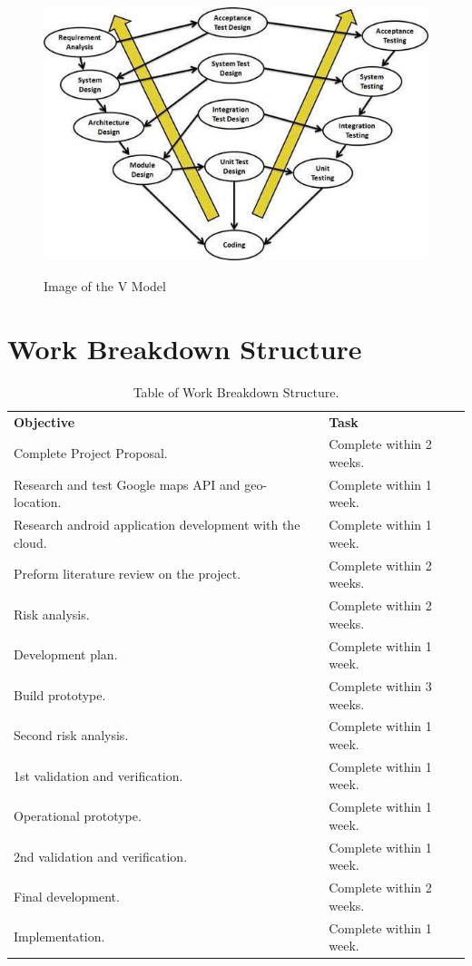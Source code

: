 \begin{figure}[htbp]
	\center \includegraphics[width=400pt]{vshapedmodel}\\
	\caption{Image of the V Model \citep{TPoint}} \label{Figure: V Shaped Model 
		Area}
\end{figure}

\newpage
\begin{table}[!ht]
	\section{Work Breakdown Structure}
	\begin{tabular}{ l l l }
		\textbf{Objective} && \textbf{Task} \\
		Complete Project Proposal. && Complete within 2 weeks. \\
		Research and test Google maps API and geo-location. && Complete within 1 week. \\
		Research android application development with the cloud. && Complete within 1 week. \\
		Preform literature review on the project. && Complete within 2 weeks. \\
		Risk analysis. && Complete within 2 weeks. \\
		Development plan. && Complete within 1 week. \\
		Build prototype. && Complete within 3 weeks. \\
		Second risk analysis. && Complete within 1 week. \\
		1st validation and verification. && Complete within 1 week. \\
		Operational prototype. && Complete within 1 week. \\
		2nd validation and verification. && Complete within 1 week. \\
		Final development. && Complete within 2 weeks. \\
		Implementation. && Complete within 1 week. \\
	\end{tabular}
	\caption{Table of Work Breakdown Structure.}
	\label{table : Work Breakdown Structure.}
	\newpage
\end{table}

